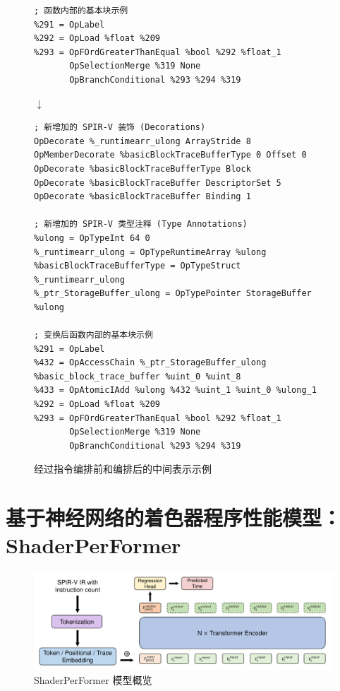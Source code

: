 \begin{figure}  %
\centering
\begin{lstlisting}[language=spirvir]
; 函数内部的基本块示例
%291 = OpLabel
%292 = OpLoad %float %209
%293 = OpFOrdGreaterThanEqual %bool %292 %float_1
       OpSelectionMerge %319 None
       OpBranchConditional %293 %294 %319
\end{lstlisting}
$ \downarrow $
\begin{lstlisting}[language=spirvir]
; 新增加的 SPIR-V 装饰 (Decorations)
OpDecorate %_runtimearr_ulong ArrayStride 8
OpMemberDecorate %basicBlockTraceBufferType 0 Offset 0
OpDecorate %basicBlockTraceBufferType Block
OpDecorate %basicBlockTraceBuffer DescriptorSet 5
OpDecorate %basicBlockTraceBuffer Binding 1

; 新增加的 SPIR-V 类型注释 (Type Annotations)
%ulong = OpTypeInt 64 0
%_runtimearr_ulong = OpTypeRuntimeArray %ulong
%basicBlockTraceBufferType = OpTypeStruct %_runtimearr_ulong
%_ptr_StorageBuffer_ulong = OpTypePointer StorageBuffer %ulong

; 变换后函数内部的基本块示例
%291 = OpLabel
%432 = OpAccessChain %_ptr_StorageBuffer_ulong %basic_block_trace_buffer %uint_0 %uint_8
%433 = OpAtomicIAdd %ulong %432 %uint_1 %uint_0 %ulong_1
%292 = OpLoad %float %209
%293 = OpFOrdGreaterThanEqual %bool %292 %float_1
       OpSelectionMerge %319 None
       OpBranchConditional %293 %294 %319
\end{lstlisting}
\caption{经过指令编排前和编排后的中间表示示例}
\label{fig:modifiedcode}
\end{figure}

\section{基于神经网络的着色器程序性能模型：ShaderPerFormer}

\begin{figure}[h]
  \centering
  \includegraphics[width=1\linewidth]{figures/ShaderPerFormer(1)_20240103233446.pdf}
  \caption{ShaderPerFormer 模型概览}
  \label{fig:spf_overview}
\end{figure}

